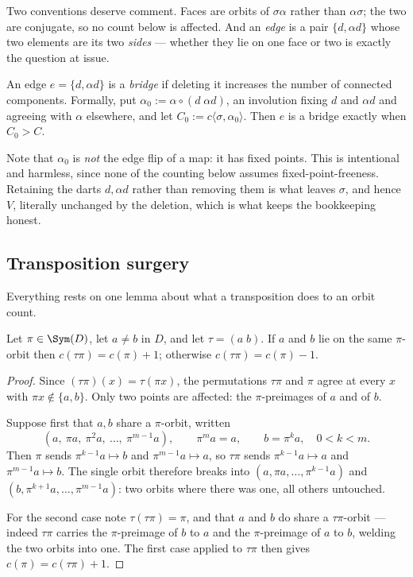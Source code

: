 Two conventions deserve comment. Faces are orbits of $\sigma\alpha$ rather
than $\alpha\sigma$; the two are conjugate, so no count below is affected.
And an \emph{edge} is a pair $\{d,\alpha d\}$ whose two elements are its
two \emph{sides} --- whether they lie on one face or two is exactly the
question at issue.

\begin{definition}[bridge]\label{def:bridge}
An edge $e = \{d, \alpha d\}$ is a \emph{bridge} if deleting it increases
the number of connected components. Formally, put
$\alpha_0 := \alpha \circ (d\;\alpha d)$, an involution fixing $d$ and
$\alpha d$ and agreeing with $\alpha$ elsewhere, and let
$C_0 := c\langle \sigma, \alpha_0\rangle$. Then $e$ is a bridge exactly
when $C_0 > C$.
\end{definition}

Note that $\alpha_0$ is \emph{not} the edge flip of a map: it has fixed
points. This is intentional and harmless, since none of the counting below
assumes fixed-point-freeness. Retaining the darts $d, \alpha d$ rather than
removing them is what leaves $\sigma$, and hence $V$, literally unchanged
by the deletion, which is what keeps the bookkeeping honest.

\subsection{Transposition surgery}

Everything rests on one lemma about what a transposition does to an orbit
count.

\begin{lemma}\label{lem:split-merge}
Let $\pi \in \Sym(D)$, let $a \neq b$ in $D$, and let $\tau = (a\;b)$. If
$a$ and $b$ lie on the same $\pi$-orbit then $c(\tau\pi) = c(\pi) + 1$;
otherwise $c(\tau\pi) = c(\pi) - 1$.
\end{lemma}

\begin{proof}
Since $(\tau\pi)(x) = \tau(\pi x)$, the permutations $\tau\pi$ and $\pi$
agree at every $x$ with $\pi x \notin \{a,b\}$. Only two points are
affected: the $\pi$-preimages of $a$ and of $b$.

Suppose first that $a,b$ share a $\pi$-orbit, written
\[
  (a,\ \pi a,\ \pi^2 a,\ \dots,\ \pi^{m-1}a), \qquad \pi^m a = a, \qquad
  b = \pi^k a, \quad 0 < k < m .
\]
Then $\pi$ sends $\pi^{k-1}a \mapsto b$ and $\pi^{m-1}a \mapsto a$, so
$\tau\pi$ sends $\pi^{k-1}a \mapsto a$ and $\pi^{m-1}a \mapsto b$. The
single orbit therefore breaks into
$(a, \pi a, \dots, \pi^{k-1}a)$ and $(b, \pi^{k+1}a, \dots, \pi^{m-1}a)$:
two orbits where there was one, all others untouched.

For the second case note $\tau(\tau\pi) = \pi$, and that $a$ and $b$ do
share a $\tau\pi$-orbit --- indeed $\tau\pi$ carries the $\pi$-preimage of
$b$ to $a$ and the $\pi$-preimage of $a$ to $b$, welding the two orbits
into one. The first case applied to $\tau\pi$ then gives
$c(\pi) = c(\tau\pi) + 1$.
\end{proof}

